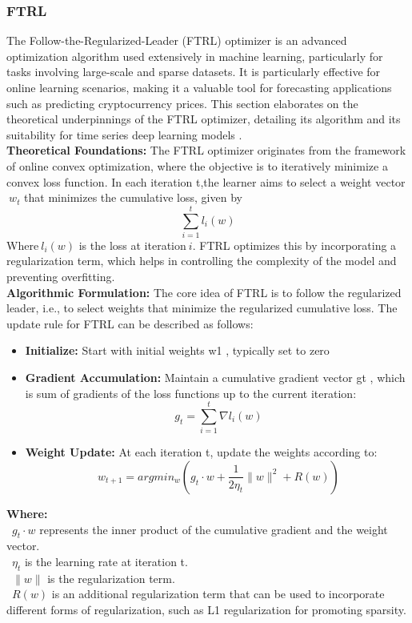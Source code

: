\documentclass{ieeeojies}
\begin{document}
\subsubsection{FTRL}
The Follow-the-Regularized-Leader (FTRL) optimizer is an advanced optimization algorithm used extensively in machine learning, particularly for tasks involving large-scale and sparse datasets. It is particularly effective for online learning scenarios, making it a valuable tool for forecasting applications such as predicting cryptocurrency prices. This section elaborates on the theoretical underpinnings of the FTRL optimizer, detailing its algorithm and its suitability for time series deep learning models \cite{Ftrl_1}.\\
\textbf{Theoretical Foundations:} 
The FTRL optimizer originates from the framework of online convex optimization, where the objective is to iteratively minimize a convex loss function. In each iteration t,the learner aims to select a weight vector $\ w_t$ that minimizes the cumulative loss, given by
\[\displaystyle \sum_{i=1}^{t} l_i(w) \]
Where$\ l_i(w)$ is the loss at iteration$\ i$. FTRL optimizes this by incorporating a regularization term, which helps in controlling the complexity of the model and preventing overfitting.\\
\textbf{Algorithmic Formulation:} The core idea of FTRL is to follow the regularized leader, i.e., to select weights that minimize the regularized cumulative loss. The update rule for FTRL can be described as follows:
\begin{itemize}
    \item \textbf{Initialize:} Start with initial weights w1 , typically set to zero
    \item \textbf{Gradient Accumulation:} Maintain a cumulative gradient vector gt , which is sum of gradients of the loss functions up to the current iteration:
    \[\ g_t = \displaystyle \sum_{i=1}^{t} \nabla l_i(w) \]
    \item \textbf{Weight Update:} At each iteration t, update the weights according to:
    \[\ w_{t+1} = argmin_w \left( g_t \cdot w + \frac{1}{2\eta_t} \|w\|^2 + R(w) \right)\]
\end{itemize}

\textbf{Where:} \\
        \indent\textbullet\ \( g_t \cdot w\) represents the inner product of the cumulative gradient and the weight vector.\\
        \indent\textbullet\ \(\eta_t\) is the learning rate at iteration t.\\
        \indent\textbullet\ \(\| w \|\) is the regularization term.\\
        \indent\textbullet\ \(R(w)\) is an additional regularization term that can be used to incorporate different forms of regularization, such as L1 regularization for promoting sparsity.\\
\end{document}

